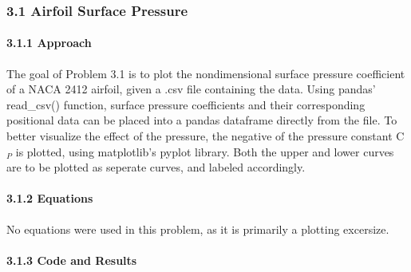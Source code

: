 \documentclass[11pt]{article}
\begin{document}
\hypertarget{airfoil-surface-pressure}{%
\subsubsection{3.1 \textbar{} Airfoil Surface
Pressure}\label{airfoil-surface-pressure}}

\hypertarget{approach}{%
\paragraph{3.1.1 \textbar{} Approach}\label{approach}}

The goal of Problem 3.1 is to plot the nondimensional surface pressure
coefficient of a NACA 2412 airfoil, given a .csv file containing the
data. Using pandas' read\_csv() function, surface pressure coefficients
and their corresponding positional data can be placed into a pandas
dataframe directly from the file. To better visualize the effect of the
pressure, the negative of the pressure constant C\(_P\) is plotted,
using matplotlib's pyplot library. Both the upper and lower curves are
to be plotted as seperate curves, and labeled accordingly.

\hypertarget{equations}{%
\paragraph{3.1.2 \textbar{} Equations}\label{equations}}

No equations were used in this problem, as it is primarily a plotting
excersize.

\hypertarget{code-and-results}{%
\paragraph{3.1.3 \textbar{} Code and Results}\label{code-and-results}}
\end{document}
